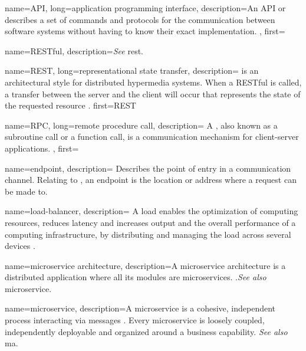 {
    name=API,
    long={application programming interface},
    description={An API or  describes a set of commands and
    protocols for the communication between software systems without having to
    know their exact implementation. },
    first=
}

{
    name=RESTful,
    description={\textit{See} \gls{rest}.}
}

{
    name=REST,
    long={representational state transfer},
    description={
     is an architectural style for distributed hypermedia
    systems. When a RESTful  is called, a transfer between the
    server and the client will occur that represents the state of the requested
    resource \autocite{Avraham_2017}.
    }
    first=REST %
}

{
    name=RPC,
    long={remote procedure call},
    description={
    A , also known as a subroutine call or a function call, is
    a communication mechanism for client-server applications.
    },
    first=
}

{
    name=endpoint,
    description={
    Describes the point of entry in a communication channel. Relating to
    , an endpoint is the location or address where a request can
    be made to.
    }
}

{
    name=load-balancer, 
    description={
    A load enables the optimization of computing resources,
    reduces latency and increases output and the overall performance of a
    computing infrastructure, by distributing and managing the load across
    several devices \autocite{Techopedia_2012}.
    }
}

{
    name={microservice architecture},
    description={A microservice architecture is a distributed application where
    all its modules are microservices. \autocite{Dragoni_etal_2017}.\textit{See
    also} \gls{microservice}.}
}

{
    name=microservice,
    description={A microservice is a cohesive, independent process interacting
    via messages \autocite{Dragoni_etal_2017}. Every microservice is loosely
    coupled, independently deployable and organized around a business
    capability. \textit{See also} \gls{ma}.} 
}

